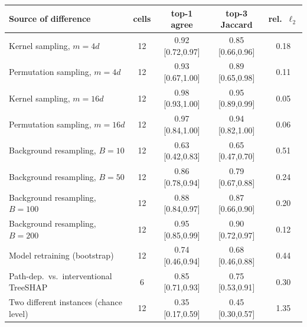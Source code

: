 \begin{tabular}{lcccc}
\toprule
Source of difference & cells & top-1 agree & top-3 Jaccard & rel.\ $\ell_2$\\
\midrule
Kernel sampling, $m=4d$ & 12 & 0.92 [0.72,0.97] & 0.85 [0.66,0.96] & 0.18\\
Permutation sampling, $m=4d$ & 12 & 0.93 [0.67,1.00] & 0.89 [0.65,0.98] & 0.11\\
Kernel sampling, $m=16d$ & 12 & 0.98 [0.93,1.00] & 0.95 [0.89,0.99] & 0.05\\
Permutation sampling, $m=16d$ & 12 & 0.97 [0.84,1.00] & 0.94 [0.82,1.00] & 0.06\\
Background resampling, $B=10$ & 12 & 0.63 [0.42,0.83] & 0.65 [0.47,0.70] & 0.51\\
Background resampling, $B=50$ & 12 & 0.86 [0.78,0.94] & 0.79 [0.67,0.88] & 0.24\\
Background resampling, $B=100$ & 12 & 0.88 [0.84,0.97] & 0.87 [0.66,0.90] & 0.20\\
Background resampling, $B=200$ & 12 & 0.95 [0.85,0.99] & 0.90 [0.72,0.97] & 0.12\\
Model retraining (bootstrap) & 12 & 0.74 [0.46,0.94] & 0.68 [0.46,0.88] & 0.44\\
Path-dep.\ vs.\ interventional TreeSHAP & 6 & 0.85 [0.71,0.93] & 0.75 [0.53,0.91] & 0.30\\
Two different instances (chance level) & 12 & 0.35 [0.17,0.59] & 0.45 [0.30,0.57] & 1.35\\
\bottomrule
\end{tabular}
